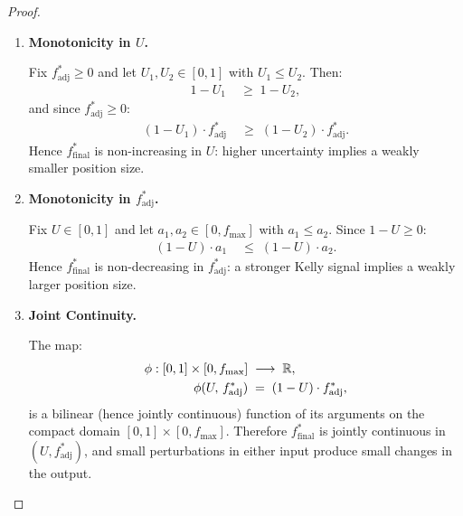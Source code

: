 \documentclass[12pt,openany]{book}
\numberwithin{equation}{chapter}
\theoremstyle{plain}
\theoremstyle{definition}
\theoremstyle{remark}
\numberwithin{equation}{chapter}
\theoremstyle{plain}
\begin{document}
\begin{proof}
\begin{enumerate}
  \item[\textup{(8)}] \textbf{Monotonicity in $U$.}

        Fix $f^*_{\mathrm{adj}} \geq 0$ and let
        $U_1, U_2 \in [0,1]$ with $U_1 \leq U_2$.  Then:
        \begin{align}
          1 - U_1 &\;\geq\; 1 - U_2,
          \label{eq:mono-U-step}
        \end{align}
        and since $f^*_{\mathrm{adj}} \geq 0$:
        \begin{align}
          (1-U_1)\cdot f^*_{\mathrm{adj}}
          &\;\geq\;
          (1-U_2)\cdot f^*_{\mathrm{adj}}.
          \label{eq:mono-U}
        \end{align}
        Hence $f^*_{\mathrm{final}}$ is non-increasing in
        $U$: higher uncertainty implies a weakly smaller
        position size.

  \item[\textup{(9)}] \textbf{Monotonicity in
        $f^*_{\mathrm{adj}}$.}

        Fix $U \in [0,1]$ and let
        $a_1, a_2 \in [0, f_{\max}]$ with $a_1 \leq a_2$.
        Since $1 - U \geq 0$:
        \begin{align}
          (1-U)\cdot a_1
          &\;\leq\;
          (1-U)\cdot a_2.
          \label{eq:mono-fadj}
        \end{align}
        Hence $f^*_{\mathrm{final}}$ is non-decreasing in
        $f^*_{\mathrm{adj}}$: a stronger Kelly signal implies
        a weakly larger position size.

  \item[\textup{(10)}] \textbf{Joint Continuity.}

        The map:
        \begin{align}
          \phi : [0,1] \times [0, f_{\max}]
          &\;\longrightarrow\; \mathbb{R},
          \notag \\
          \phi(U,\, f^*_{\mathrm{adj}})
          &\;=\; (1-U)\cdot f^*_{\mathrm{adj}},
          \label{eq:phi-bilinear}
        \end{align}
        is a bilinear (hence jointly continuous) function
        of its arguments on the compact domain
        $[0,1] \times [0, f_{\max}]$.  Therefore
        $f^*_{\mathrm{final}}$ is jointly continuous in
        $(U, f^*_{\mathrm{adj}})$, and small perturbations
        in either input produce small changes in the output.


\end{enumerate}
\end{proof}
\end{document}
